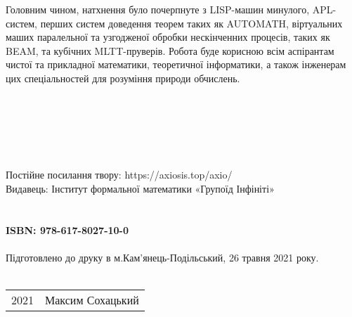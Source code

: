Головним чином, натхнення було почерпнуте з
LISP-машин минулого, APL-систем, перших систем
доведення теорем таких як AUTOMATH, віртуальних
маших паралельної та узгодженої обробки нескінченних
процесів, таких як BEAM, та кубічних MLTT-пруверів.
Робота буде корисною всім аспірантам чистої та
прикладної математики, теоретичної інформатики,
а також інженерам цих спеціальностей для розуміння
природи обчислень.
\\
\\
\\
\\
\\
\\
\\
Постійне посилання твору: https://axiosis.top/axio/ \\
Видавець: Інститут формальної математики «Групоїд Інфініті» \\
\\
\\
{\bf ISBN: 978-617-8027-10-0 \hspace{2em}} \\ \\
Підготовлено до друку в м.Кам'янець-Подільський, 26 травня 2021 року.
\\
\\
\begin{tabular}{ll}
\textcopyright{} 2021 & Максим Сохацький
\end{tabular}


\newpage
\cleartorecto
\tableofcontents*
\mainmatter
